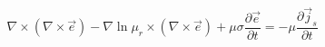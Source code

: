 \begin{equation}
    \nabla \times (\nabla \times \vec{e}) - \nabla \ln \mu_r \times (\nabla \times \vec{e}) + \mu \sigma \frac{\partial \vec{e}}{\partial t} = -\mu \frac{\partial \vec{j}_s}{\partial t}
\label{eq:permeability-tdem}
\end{equation}
